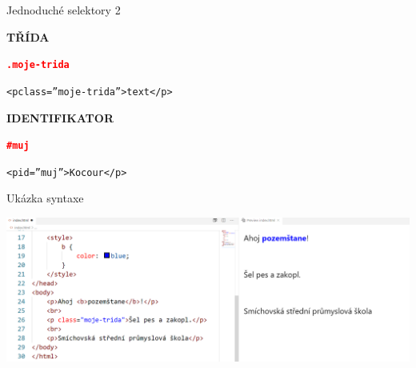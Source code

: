 \documentclass[aspectratio=169]{beamer}
\begin{document}
\begin{frame}{Jednoduché selektory 2}
    \begin{multicols}{2}
        \centering

        \begin{cardTiny}
            \begin{center}
                \textbf{TŘÍDA}
            \end{center}

            \begin{flushleft}
                \begin{alltt}
                    \textbf{\textcolor{red}{.moje-trida}} \string{\\
                        \textcolor{blue}{color}: \textcolor{orange}{cyan};\\
                    \string}
                \end{alltt}
                \begin{alltt}
                    <p class=''moje-trida''>text</p>
                \end{alltt}
            \end{flushleft}
        \end{cardTiny}
        \begin{cardTiny}
            \begin{center}
                \textbf{IDENTIFIKATOR}
            \end{center}

            \begin{flushleft}
                \begin{alltt}
                    \textbf{\textcolor{red}{\#muj}} \string{\\
                        \textcolor{blue}{color}: \textcolor{orange}{lime};\\
                    \string}
                \end{alltt}
                \begin{alltt}
                    <p id=''muj''>Kocour</p>
                \end{alltt}
            \end{flushleft}
        \end{cardTiny}
    \end{multicols}
\end{frame}

\begin{frame}{Ukázka syntaxe}
    \begin{center}
        \includegraphics[width=\textwidth]{img/html-7-8-1.png}
    \end{center}
\end{frame}
\end{document}
